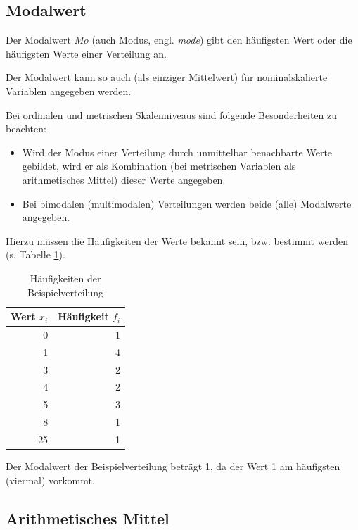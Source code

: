\documentclass[
  11pt,
  ngerman,
  a4paper,
]{report}
\providecommand{\tightlist}{%
  \setlength{\itemsep}{0pt}\setlength{\parskip}{0pt}}
\begin{document}
\hypertarget{modalwert}{%
\subsection{Modalwert}\label{modalwert}}

Der Modalwert \(\mathit{Mo}\) (auch Modus, engl. \emph{mode}) gibt den häufigsten Wert oder die häufigsten Werte einer Verteilung an.

Der Modalwert kann so auch (als einziger Mittelwert) für nominalskalierte Variablen angegeben werden.

Bei ordinalen und metrischen Skalenniveaus sind folgende Besonderheiten zu beachten:

\begin{itemize}
\tightlist
\item
  Wird der Modus einer Verteilung durch unmittelbar benachbarte Werte gebildet, wird er als Kombination (bei metrischen Variablen als arithmetisches Mittel) dieser Werte angegeben.
\item
  Bei bimodalen (multimodalen) Verteilungen werden beide (alle) Modalwerte angegeben.
\end{itemize}

Hierzu müssen die Häufigkeiten der Werte bekannt sein, bzw. bestimmt werden (s. Tabelle \ref{tab:mod}).

\begin{table}

\caption{\label{tab:mod}Häufigkeiten der Beispielverteilung}
\centering
\begin{tabular}[t]{rr}
\toprule
Wert $x_i$ & Häufigkeit $f_i$\\
\midrule
0 & 1\\
1 & 4\\
3 & 2\\
4 & 2\\
5 & 3\\
8 & 1\\
25 & 1\\
\bottomrule
\end{tabular}
\end{table}

Der Modalwert der Beispielverteilung beträgt 1, da der Wert 1 am häufigsten (viermal) vorkommt.

\hypertarget{arithmetisches-mittel}{%
\subsection{Arithmetisches Mittel}\label{arithmetisches-mittel}}
\end{document}
